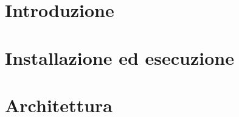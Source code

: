 \documentclass[a4paper, oneside, openany, dvipsnames, table]{article}
\begin{document}
\copertina{} 

\newpage
\tableofcontents
\newpage
\listoffigures
\newpage
\listoftables
\newpage

\section{Introduzione}

\newpage
\section{Installazione ed esecuzione}

\newpage
\section{Architettura}

\end{document}
